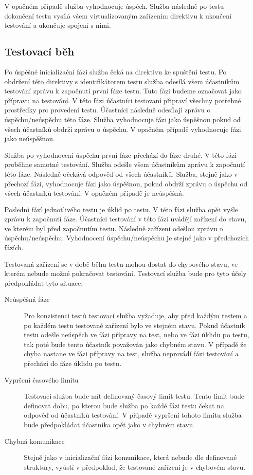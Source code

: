 V opačném případě služba vyhodnocuje úspěch. Služba následně po testu dokončení testu vysílá všem virtualizovaným zařízením direktivu k ukončení testování a ukončuje spojení s nimi.  

\subsection{Testovací běh}\label{test_run}
Po úspěšné inicializační fázi služba čeká na direktivu ke spuštění testu. Po obdržení této direktivy s identifikátorem testu služba odesílá všem účastníkům testování zprávu k započnutí první fáze testu. Tuto fázi budeme označovat jako přípravu na testování. V této fázi účastníci testovaní připraví všechny potřebné prostředky pro provedení testu. Účastníci následně odesílají zprávu o úspěchu/neúspěchu této fáze. Služba vyhodnocuje fázi jako úspěšnou pokud od všech účastníků obdrží zprávu o úspěchu. V opačném případě vyhodnocuje fázi jako neúspěšnou.

Služba po vyhodnocení úspěchu první fáze přechází do fáze druhé. V této fázi proběhne samotné testování. Služba odešle všem účastníkům zprávu k započnutí této fáze. Následně očekává odpověď od všech účastníků. Služba, stejně jako v přechozí fázi, vyhodnocuje fázi jako úspěšnou, pokud obdrží zprávu o úspěchu od všech účastníků testování. V opačném případě je neúspěšná.

Poslední fází jednotlivého testu je úklid po testu. V této fázi služba opět vyšle zprávu k započnutí fáze. Účastníci testování v této fázi uvádějí zařízení do stavu, ve kterém byl před započnutím testu. Následně zařízení odešlou zprávu o úspěchu/neúspěchu. Vyhodnocení úspěchu/neúspěchu je stejné jako v předchozích fázích.

Testovaná zařízení se v době běhu testu mohou dostat do chybového stavu, ve kterém nebude možné pokračovat testování. Testovací služba bude pro tyto účely předpokládat tyto situace:

\begin{description}
    \item[Neúspěšná fáze] Pro konzistenci testů testovací služba vyžaduje, aby před každým testem a po každém testu testované zařízení bylo ve stejném stavu. Pokud účastník testu odešle neúspěch ve fázi přípravy na test, nebo ve fázi úklidu po testu, tak poté bude tento účastník považován jako chybném stavu. V případě že chyba nastane ve fázi přípravy na test, služba neprovádí fázi testování a přechází do fáze úklidu po testu. 
    \item[Vypršení časového limitu] Testovací služba bude mít definovaný časový limit testu. Tento limit bude definovat dobu, po kterou bude služba po každé fázi testu čekat na odpověď od účastníků testování. V případě vypršení tohoto limitu služba bude předpokládat účastníka opět jako v chybném stavu.
    \item[Chybná komunikace] Stejně jako v inicializační fázi komunikace, která nebude dle definované struktury, vyústí v předpoklad, že testované zařízení je v chybovém stavu. 
\end{description}

